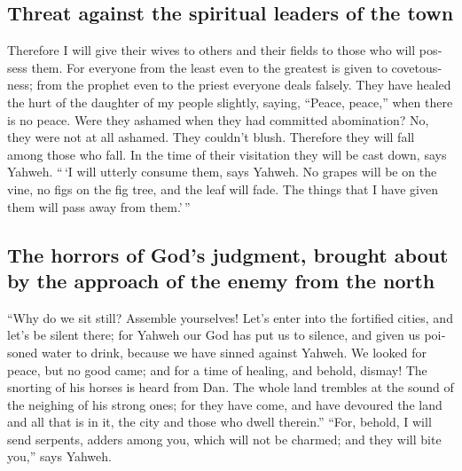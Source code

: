 \begin{paracol}{2}
\begin{otherlanguage}{english}
\hypertarget{threat-against-the-spiritual-leaders-of-the-town}{%
\subsection{Threat against the spiritual leaders of the
town}\label{threat-against-the-spiritual-leaders-of-the-town}}

 Therefore I will give their wives to others and their
fields to those who will possess them. For everyone from the least even
to the greatest is given to covetousness; from the prophet even to the
priest everyone deals falsely.  They have healed the hurt
of the daughter of my people slightly, saying, ``Peace, peace,'' when
there is no peace.  Were they ashamed when they had
committed abomination? No, they were not at all ashamed. They couldn't
blush. Therefore they will fall among those who fall. In the time of
their visitation they will be cast down, says Yahweh. 
``\,`I will utterly consume them, says Yahweh. No grapes will be on the
vine, no figs on the fig tree, and the leaf will fade. The things that I
have given them will pass away from them.'\,''

\hypertarget{the-horrors-of-gods-judgment-brought-about-by-the-approach-of-the-enemy-from-the-north}{%
\subsection{The horrors of God's judgment, brought about by the approach
of the enemy from the
north}\label{the-horrors-of-gods-judgment-brought-about-by-the-approach-of-the-enemy-from-the-north}}

 ``Why do we sit still? Assemble yourselves! Let's enter
into the fortified cities, and let's be silent there; for Yahweh our God
has put us to silence, and given us poisoned water to drink, because we
have sinned against Yahweh.  We looked for peace, but no
good came; and for a time of healing, and behold, dismay!
 The snorting of his horses is heard from Dan. The whole
land trembles at the sound of the neighing of his strong ones; for they
have come, and have devoured the land and all that is in it, the city
and those who dwell therein.''  ``For, behold, I will
send serpents, adders among you, which will not be charmed; and they
will bite you,'' says Yahweh.

\hypertarget{the-despair-of-the-prophet-and-his-pain-for-the-moral-alteration-of-the-people}{%
}
\end{otherlanguage}
\end{paracol}
